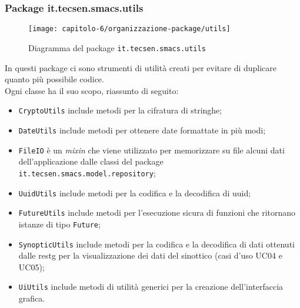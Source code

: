 \subsubsection{Package it.tecsen.smacs.utils}
\label{subsubsec:it-tecsen-smacs-utils}

\begin{figure}[!h]
  \centering 
  \texttt{[image: capitolo-6/organizzazione-package/utils]} 
  \caption{Diagramma del package \texttt{it.tecsen.smacs.utils}}
\end{figure}
In questi package ci sono strumenti di utilità creati per evitare di duplicare quanto più possibile codice.\\
Ogni classe ha il suo scopo, riassunto di seguito:
\begin{itemize}
  \item \texttt{CryptoUtils} include metodi per la cifratura di stringhe;
  \item \texttt{DateUtils} include metodi per ottenere date formattate in più modi;
  \item \texttt{FileIO} è un \emph{mixin} che viene utilizzato per memorizzare su file alcuni dati dell'applicazione dalle classi del package \texttt{it.tecsen.smacs.model.repository};
  \item \texttt{UuidUtils} include metodi per la codifica e la decodifica di \gls{uuid};
  \item \texttt{FutureUtils} include metodi per l'esecuzione sicura di funzioni che ritornano istanze di tipo \texttt{Future};
  \item \texttt{SynopticUtils} include metodi per la codifica e la decodifica di dati ottenuti dalle \gls{restg} per la visualizzazione dei dati del sinottico (casi d'uso UC04 e UC05);
  \item \texttt{UiUtils} include metodi di utilità generici per la creazione dell'interfaccia grafica.
\end{itemize}